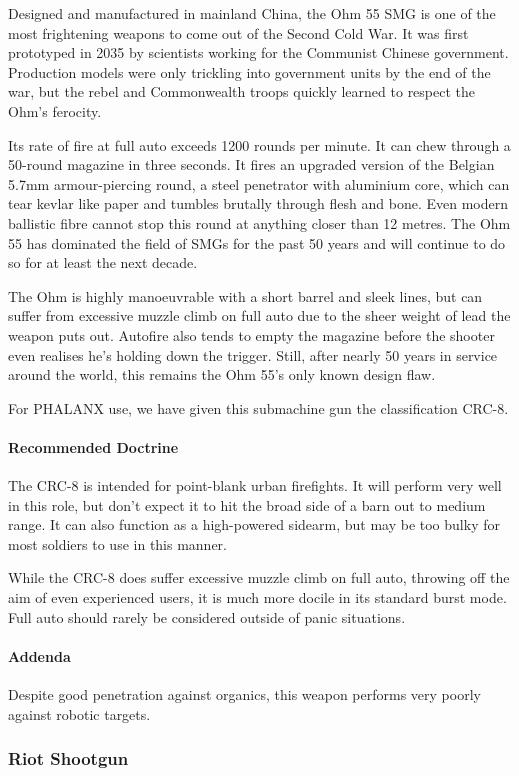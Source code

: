 Designed and manufactured in mainland China, the Ohm 55 SMG is one of the most frightening weapons to come out of the Second Cold War. It was first prototyped in 2035 by scientists working for the Communist Chinese government. Production models were only trickling into government units by the end of the war, but the rebel and Commonwealth troops quickly learned to respect the Ohm's ferocity.

Its rate of fire at full auto exceeds 1200 rounds per minute. It can chew through a 50-round magazine in three seconds. It fires an upgraded version of the Belgian 5.7mm armour-piercing round, a steel penetrator with aluminium core, which can tear kevlar like paper and tumbles brutally through flesh and bone. Even modern ballistic fibre cannot stop this round at anything closer than 12 metres. The Ohm 55 has dominated the field of SMGs for the past 50 years and will continue to do so for at least the next decade.

The Ohm is highly manoeuvrable with a short barrel and sleek lines, but can suffer from excessive muzzle climb on full auto due to the sheer weight of lead the weapon puts out. Autofire also tends to empty the magazine before the shooter even realises he's holding down the trigger. Still, after nearly 50 years in service around the world, this remains the Ohm 55's only known design flaw.

For PHALANX use, we have given this submachine gun the classification CRC-8.
\paragraph{Recommended Doctrine}
The CRC-8 is intended for point-blank urban firefights. It will perform very well in this role, but don't expect it to hit the broad side of a barn out to medium range. It can also function as a high-powered sidearm, but may be too bulky for most soldiers to use in this manner.

While the CRC-8 does suffer excessive muzzle climb on full auto, throwing off the aim of even experienced users, it is much more docile in its standard burst mode. Full auto should rarely be considered outside of panic situations.
\paragraph*{Addenda}
Despite good penetration against organics, this weapon performs very poorly against robotic targets. 
\subsubsection*{Riot Shootgun}
